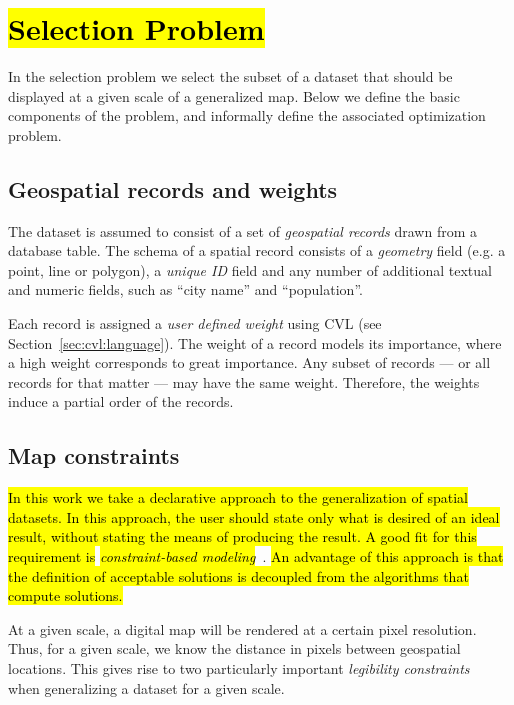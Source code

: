 \section{\hl{Selection Problem}}
\label{sec:background}

In the selection problem we select the subset of a dataset that should be displayed at a given scale of a generalized map. Below we define the basic components of the problem, and informally define the associated optimization problem.

\subsection{Geospatial records and weights}
\label{sec:records}

The dataset is assumed to consist of a set of \emph{geospatial records} drawn from a database table. The schema of a spatial record consists of a \emph{geometry} field (e.g. a point, line or polygon), a \emph{unique ID} field and any number of additional textual and numeric fields, such as ``city name'' and ``population''.

Each record is assigned a \emph{user defined weight} using CVL (see Section~\ref{sec:cvl:language}). The weight of a record models its importance, where a high weight corresponds to great importance. Any subset of records --- or all records for that matter --- may have the same weight. Therefore, the weights induce a partial order of the records.

\subsection{Map constraints}
\label{sec:constraints}

\hl{In this work we take a declarative approach to the generalization of spatial datasets. In this approach, the user should state only what is desired of an ideal result, without stating the means of producing the result. A good fit for this requirement is }\emph{\hl{constraint-based modeling}}~\cite{harrie2007modelling}. \hl{An advantage of this approach is that the definition of acceptable solutions is decoupled from the algorithms that compute solutions.}

At a given scale, a digital map will be rendered at a certain pixel resolution. Thus, for a given scale, we know the distance in pixels between geospatial locations. This gives rise to two particularly important \emph{legibility constraints}~\cite{harrie2007modelling} when generalizing a dataset for a given scale.

